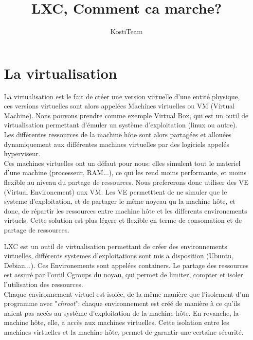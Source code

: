 \documentclass{article}
\author{KostiTeam}
\title{LXC, Comment ca marche?}
\begin{document}
\maketitle
\newpage
\tableofcontents
\newpage

\section{La virtualisation}
La virtualisation est le fait de cr\'eer une version virtuelle d'une entit\'e physique, ces versions virtuelles
sont alors appel\'ees Machines virtuelles ou VM (Virtual Machine). Nous 
pouvons prendre comme exemple Virtual Box, qui est un outil de virtualisation 
permettant d'\'emuler un syst\`eme d'exploitation (linux ou autre). Les diff\'erentes ressources de la machine 
h\^ote sont alors partag\'ees et allou\'ees dynamiquement aux diff\'erentes machines virtuelles par des logiciels
appel\'es hyperviseur.\\

Ces machines virtuelles ont un d\'efaut pour nous: elles simulent tout le materiel d'une machine (processeur, RAM...), ce qui les rend moins performante, et moins flexible au niveau du partage de ressources. Nous prefererons donc utiliser des VE (Virtual Environement) aux VM. Les VE permetttent de ne simuler que le systeme d'exploitation, et de partager le m\^eme noyeau qu la machine h\^ote, et donc, de r\'epartir les ressources entre machine h\^ote et les differents environements virtuels. Cette solution est plus l\'egere et flexible en terme de consomation et de partage de ressources.  

LXC est un outil de virtualisation permettant de cr\'eer des environnements virtuelles, diff\'erents systemes d'exploitations sont mis a disposition (Ubuntu, Debian...). Ces Environements sont appel\'ees containers. Le partage des ressources est assur\'e par l'outil Cgroups du noyau, qui permet de limiter, compter et isoler l'utilisation des ressources.\\

Chaque environnement virtuel est isol\'ee, de la m\^eme mani\`ere que l'isolement d'un programme 
avec "\emph{chroot}": chaque environnement est cr\'e\'e de mani\`ere \`a ce qu'ils naient pas acc\`es au syst\`eme 
d'exploitation de la machine h\^ote. En revanche, la machine h\^ote, elle, a acc\`es aux machines virtuelles.
Cette isolation entre les machines virtuelles et la machine h\^ote, permet de garantir une certaine s\'ecurit\'e.\\
\end{document}
